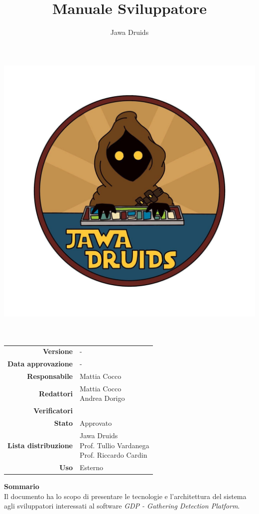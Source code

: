 



\makeatletter
\begin{titlepage}
	\begin{center}
		\vspace*{-4cm}
		\author{Jawa Druids}
		\title{Manuale Sviluppatore}
		\date{} %
		\includegraphics[width=0.5\linewidth]{../immagini/DRUIDSLOGO.jpg}\\[4ex]
		{\huge \bfseries  \@title }\\[2ex]
		{\LARGE  \@author}\\[50ex]
		\vspace*{-9cm}
		\begin{table}[H]
			\renewcommand{\arraystretch}{1.4}
			\centering
			\begin{tabular}{r | l}
				\textbf{Versione} & - \\%
				\textbf{Data approvazione} & -\\
				\textbf{Responsabile} & Mattia Cocco \\
				\textbf{Redattori} & \makecell[tl]{Mattia Cocco \\ Andrea Dorigo} \\		
				\textbf{Verificatori} & \makecell[tl]{-} \\
				\textbf{Stato} & Approvato\\
				\textbf{Lista distribuzione} & \makecell[tl]{Jawa Druids \\ Prof. Tullio Vardanega \\ Prof. Riccardo Cardin}\\
				\textbf{Uso} & Esterno
			\end{tabular}
		\end{table}
		\vspace{0.1cm}
		\hfill \break
		\fontsize{17}{10}\textbf{Sommario} \\
		\vspace{0.1cm}
		Il documento ha lo scopo di presentare le tecnologie e l'architettura del sistema agli sviluppatori interessati al software \emph{\normalsize{\textit{GDP - Gathering Detection Platform}}}.
	\end{center}
\end{titlepage}
\makeatother
	

